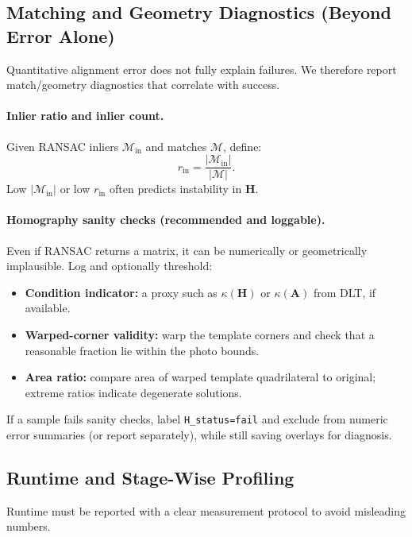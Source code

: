 \subsection{Matching and Geometry Diagnostics (Beyond Error Alone)}
Quantitative alignment error does not fully explain failures. We therefore report match/geometry diagnostics that correlate with success.

\paragraph{Inlier ratio and inlier count.}
Given RANSAC inliers $\mathcal{M}_{\text{in}}$ and matches $\mathcal{M}$, define:
\[
r_{\text{in}}=\frac{|\mathcal{M}_{\text{in}}|}{|\mathcal{M}|}.
\]
Low $|\mathcal{M}_{\text{in}}|$ or low $r_{\text{in}}$ often predicts instability in $\mathbf{H}$.

\paragraph{Homography sanity checks (recommended and loggable).}
Even if RANSAC returns a matrix, it can be numerically or geometrically implausible. Log and optionally threshold:
\begin{itemize}
  \item \textbf{Condition indicator:} a proxy such as $\kappa(\mathbf{H})$ or $\kappa(\mathbf{A})$ from DLT, if available.
  \item \textbf{Warped-corner validity:} warp the template corners and check that a reasonable fraction lie within the photo bounds.
  \item \textbf{Area ratio:} compare area of warped template quadrilateral to original; extreme ratios indicate degenerate solutions.
\end{itemize}
If a sample fails sanity checks, label \texttt{H\_status=fail} and exclude from numeric error summaries (or report separately), while still saving overlays for diagnosis.

\subsection{Runtime and Stage-Wise Profiling}
Runtime must be reported with a clear measurement protocol to avoid misleading numbers.



